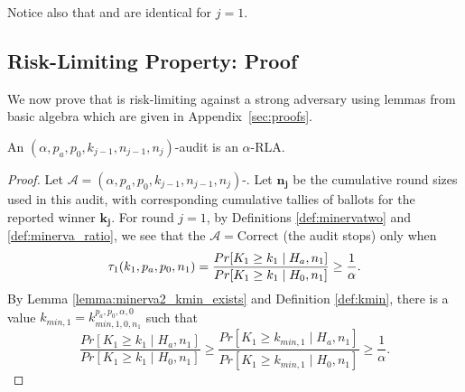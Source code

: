 Notice also that \Providence and \Minerva are identical for $j=1$. 

\subsection{Risk-Limiting Property: Proof}
\label{sec:proof}
We now prove that \Providence is risk-limiting against a strong adversary using lemmas from basic algebra which are given in Appendix~\ref{sec:proofs}.

\begin{theorem}
\label{thm:minerva2_is_rla_new}
An $(\alpha,p_a, p_0,k_{j-1},n_{j-1},n_j)$-\Providence audit is an
$\alpha$-RLA.
\end{theorem}
\begin{proof}
Let $\mathcal{A}=(\alpha,p_a, p_0,k_{j-1},n_{j-1},n_j)$-\Providence.
Let $\bm{n_j}$ be the cumulative round sizes used in this
audit, with corresponding cumulative tallies of
ballots for the reported winner $\bm{k_j}$.
For round $j=1$, by Definitions \ref{def:minervatwo}
and \ref{def:minerva_ratio}, we see that
the $\mathcal{A}=\text{Correct}$ (the audit stops) only when
$$
\tau_1(k_{1},p_a,p_0,n_1)\\
=\frac{Pr[K_{1} \geq k_{1} \mid H_a, n_1]}{Pr[K_{1} \geq k_{1} \mid H_0, n_1]}
\ge \frac{1}{\alpha}.
$$
By Lemma \ref{lemma:minerva2_kmin_exists} and Definition \ref{def:kmin}, there is 
a value $k_{min,1} = k^{p_a, p_0, \alpha, 0}_{min, 1, 0, n_1}$ such that 
$$
\frac{Pr[K_{1} \geq k_{1} \mid H_a, n_1]}{Pr[K_{1} \geq k_{1} \mid H_0, n_1]}
\ge
\frac{Pr[K_{1} \geq k_{min,1} \mid H_a, n_1]}{Pr[K_{1} \geq k_{min, 1} \mid H_0, n_1]}
\ge 
\frac{1}{\alpha}.
$$


\end{proof}
